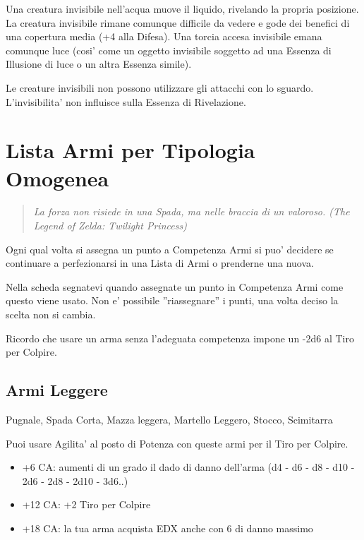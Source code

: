 \documentclass[a4paper,11pt,twoside,openany]{book}
\begin{document}
Una creatura invisibile nell'acqua muove il liquido, rivelando la propria posizione. La creatura invisibile rimane comunque difficile da vedere e gode dei benefici di una copertura media (+4 alla Difesa). Una torcia accesa invisibile emana comunque luce (cosi' come un oggetto invisibile soggetto ad una Essenza di Illusione di luce o un altra Essenza simile).

Le creature invisibili non possono utilizzare gli attacchi con lo sguardo. L'invisibilita' non influisce sulla Essenza di Rivelazione.

\pagebreak

\section{Lista Armi per Tipologia Omogenea}

\label{lista-armi-per-tipologia-omogenea}
\begin{quote}\textit{La forza non risiede in una Spada, ma nelle braccia di un valoroso. (The Legend of Zelda: Twilight Princess)
}\end{quote}

Ogni qual volta si assegna un punto a Competenza Armi si puo' decidere se continuare a perfezionarsi in una Lista di Armi o prenderne una nuova.

Nella scheda segnatevi quando assegnate un punto in Competenza Armi come questo viene usato. Non e' possibile ''riassegnare'' i punti, una volta deciso la scelta non si cambia.

Ricordo che usare un arma senza l'adeguata competenza impone un -2d6 al Tiro per Colpire.

\subsection{Armi Leggere}Pugnale, Spada Corta, Mazza leggera, Martello Leggero, Stocco, Scimitarra

Puoi usare Agilita' al posto di Potenza con queste armi per il Tiro
per Colpire.

\begin{itemize}
	\item +6 CA: aumenti di un grado il dado di danno dell'arma (d4 - d6 - d8 - d10 - 2d6 - 2d8 - 2d10 - 3d6..)
	
	\item +12 CA: +2 Tiro per Colpire
	
	\item +18 CA: la tua arma acquista EDX anche con 6 di danno massimo 
\end{itemize}
\end{document}
